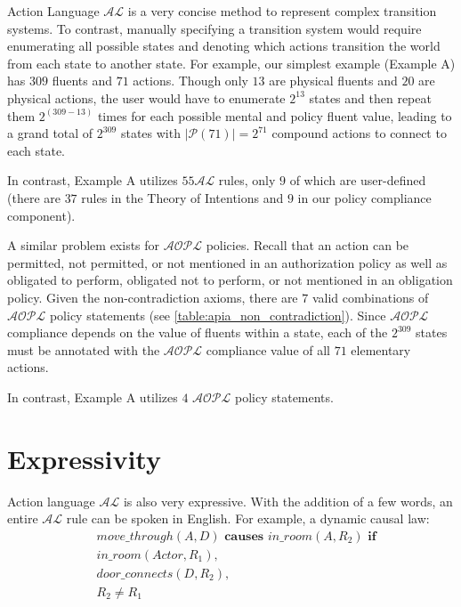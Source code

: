 Action Language $\mathcal{AL}$ is a very concise method to represent complex transition systems.
To contrast, manually specifying a transition system would require enumerating all possible states and denoting which actions transition the world from each state to another state.
For example, our simplest example (Example A) has $309$ fluents and $71$ actions.
Though only $13$ are physical fluents and $20$ are physical actions, the user would have to enumerate $2^{13}$ states and then repeat them $2^{(309-13)}$ times for each possible mental and policy fluent value, leading to a grand total of $2^{309}$ states with $|\mathcal{P}(71)|=2^{71}$ compound actions to connect to each state.

In contrast, Example A utilizes $55$$\mathcal{AL}$ rules, only $9$ of which are user-defined (there are $37$ rules in the Theory of Intentions and $9$ in our policy compliance component).

A similar problem exists for $\mathcal{AOPL}$ policies.
Recall that an action can be permitted, not permitted, or not mentioned in an authorization policy as well as obligated to perform, obligated not to perform, or not mentioned in an obligation policy.
Given the non-contradiction axioms, there are $7$ valid combinations of $\mathcal{AOPL}$ policy statements (see \cref{table:apia_non_contradiction}).
Since $\mathcal{AOPL}$ compliance depends on the value of fluents within a state, each of the $2^{309}$ states must be annotated with the $\mathcal{AOPL}$ compliance value of all $71$ elementary actions.

In contrast, Example A utilizes $4$ $\mathcal{AOPL}$ policy statements.

\section{Expressivity}

Action language $\mathcal{AL}$ is also very expressive.
With the addition of a few words, an entire $\mathcal{AL}$ rule can be spoken in English.
For example, a dynamic causal law:
\begin{equation}
\begin{split}
    & move\_through(A, D) \textbf{ causes } in\_room(A, R_{2}) \textbf{ if} \\
    & in\_room(Actor, R_{1}), \\
    & door\_connects(D, R_{2}), \\
    & R_{2} \neq R_{1}
\end{split}
\end{equation}

